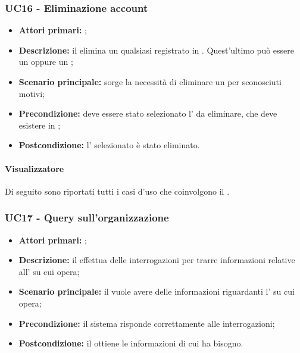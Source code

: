 \documentclass[casi-duso]{subfiles}
\begin{document}
\subsubsection{UC16 - Eliminazione account}
\label{subsub:UC16}
\begin{itemize}
  \item \textbf{Attori primari:} ;
  \item \textbf{Descrizione:} il  elimina un qualsiasi  registrato in . Quest'ultimo può essere un  oppure un ;
  \item \textbf{Scenario principale:} sorge la necessità di eliminare un  per sconosciuti motivi;
  \item \textbf{Precondizione:} deve essere stato selezionato l' da eliminare, che deve esistere in ;
  \item \textbf{Postcondizione:} l' selezionato è stato eliminato.

\end{itemize}



\paragraph{Visualizzatore}
Di seguito sono riportati tutti i casi d'uso che coinvolgono il  .

\subsubsection{UC17 - Query sull'organizzazione}
\label{subsub:UC17}
\begin{itemize}
  \item \textbf{Attori primari:} ;
  \item \textbf{Descrizione:} il  effettua delle interrogazioni per trarre informazioni relative all' su cui opera;
  \item \textbf{Scenario principale:} il  vuole avere delle informazioni riguardanti l' su cui opera;
  \item \textbf{Precondizione:} il sistema risponde correttamente alle interrogazioni;
  \item \textbf{Postcondizione:} il  ottiene le informazioni di cui ha bisogno.
\end{itemize}
\end{document}
